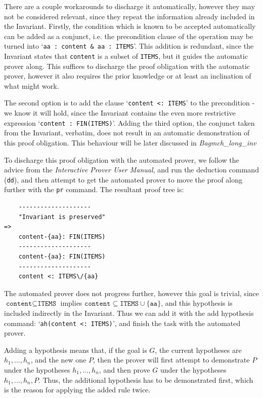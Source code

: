 \documentclass[12pt,journal,duplex]{IEEEtran}
\begin{document}
	There are a couple workarounds to discharge it automatically, however they may not be considered relevant, since they repeat the information already included in the Invariant. Firstly, the condition which is known to be accepted automatically can be added as a conjunct, i.e. the precondition clause of the operation may be turned into `\texttt{aa : content \& aa : ITEMS}'. This addition is redundant, since the Invariant states that \texttt{content} is a subset of \texttt{ITEMS}, but it guides the automatic prover along. This suffices to discharge the proof obligation with the automatic prover, however it also requires the prior knowledge or at least an inclination of what might work.

	The second option is to add the clause `\texttt{content <: ITEMS}' to the precondition - we know it will hold, since the Invariant contains the even more restrictive expression `\texttt{content :  FIN(ITEMS)}'. Adding the third option, the conjunct taken from the Invariant, verbatim, does not result in an automatic demonstration of this proof obligation. This behaviour will be later discussed in \emph{Bagmch\_long\_inv}


	To discharge this proof obligation with the automated prover, we follow the advice from the \emph{Interactive Prover User Manual}, and run the deduction command (\texttt{dd}), and then attempt to get the automated prover to move the proof along further with the \texttt{pr} command. The resultant proof tree is:

\begin{lstlisting}
	--------------------
	"Invariant is preserved"
=>
	content-{aa}: FIN(ITEMS)
	--------------------
	content-{aa}: FIN(ITEMS)
	--------------------
	content <: ITEMS\/{aa}
\end{lstlisting}

	The automated prover does not progress further, however this goal is trivial, since $\texttt{content} \subseteq \texttt{ITEMS}$ implies $\texttt{content} \subseteq \texttt{ITEMS} \cup \{\texttt{aa}\}$, and this hypothesis is included indirectly in the Invariant. Thus we can add it with the add hypothesis command: 
	`\texttt{ah(content <: ITEMS)}', and finish the task with the automated prover.
	
	Adding a hypothesis means that, if the goal is $G$, the current hypotheses are $h_1, ..., h_n$, and the new one $P$, then the prover will first attempt to demonstrate $P$ under the hypotheses $h_1, ..., h_n$, and then prove $G$ under the hypotheses $h_1, ...,h_n, P$.  Thus, the additional hypothesis has to be demonstrated first, which is the reason for applying the added rule twice.
\end{document}
